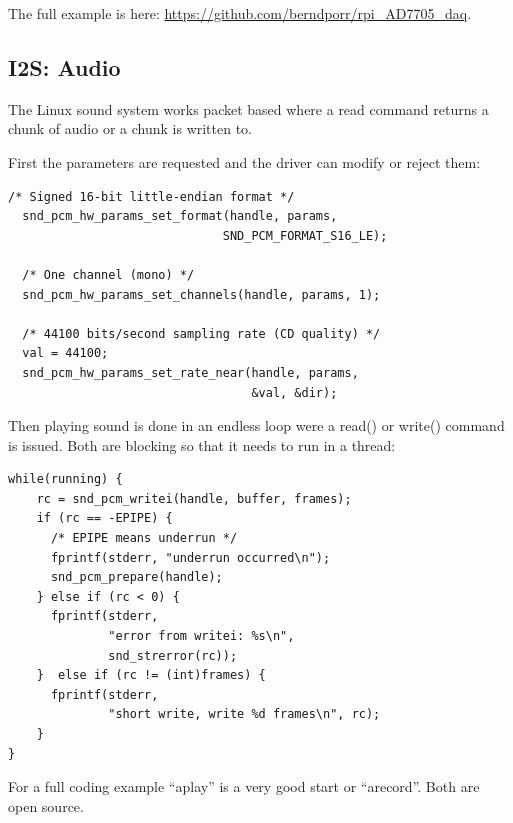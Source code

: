 \documentclass[12pt]{article}
\begin{document}
The full example is here: \url{https://github.com/berndporr/rpi_AD7705_daq}.




\subsection{I2S: Audio}
The Linux sound system works packet based where a read command
returns a chunk of audio or a chunk is written to.

First the parameters are requested and the driver can modify or
reject them:
\begin{verbatim}
/* Signed 16-bit little-endian format */
  snd_pcm_hw_params_set_format(handle, params,
                              SND_PCM_FORMAT_S16_LE);

  /* One channel (mono) */
  snd_pcm_hw_params_set_channels(handle, params, 1);

  /* 44100 bits/second sampling rate (CD quality) */
  val = 44100;
  snd_pcm_hw_params_set_rate_near(handle, params,
                                  &val, &dir);
\end{verbatim}

Then playing sound is done in an endless loop were a read()
or write() command is issued. Both are blocking so that
it needs to run in a thread:

\begin{verbatim}
while(running) {
    rc = snd_pcm_writei(handle, buffer, frames);
    if (rc == -EPIPE) {
      /* EPIPE means underrun */
      fprintf(stderr, "underrun occurred\n");
      snd_pcm_prepare(handle);
    } else if (rc < 0) {
      fprintf(stderr,
              "error from writei: %s\n",
              snd_strerror(rc));
    }  else if (rc != (int)frames) {
      fprintf(stderr,
              "short write, write %d frames\n", rc);
    }
}
\end{verbatim}

For a full coding example ``aplay'' is a very
good start or ``arecord''. Both are open source.
\end{document}
